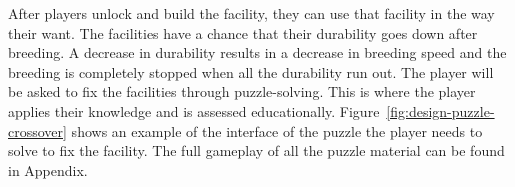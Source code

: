 \documentclass[12pt,oneside,openright,a4paper]{cpe-english-project}
\begin{document}
\begin{itemize}
After players unlock and build the facility, they can use that facility in the way their want. The facilities have a chance that their durability goes down after breeding. A decrease in durability results in a decrease in breeding speed and the breeding is completely stopped when all the durability run out. The player will be asked to fix the facilities through puzzle-solving. This is where the player applies their knowledge and is assessed educationally. Figure~\ref{fig:design-puzzle-crossover} shows an example of the interface of the puzzle the player needs to solve to fix the facility. The full gameplay of all the puzzle material can be found in Appendix.


\begin{minipage}[c]{\textwidth}\centering
{}
\label{fig:design-puzzle-crossover}
\end{minipage}


\end{itemize}
\end{document}
